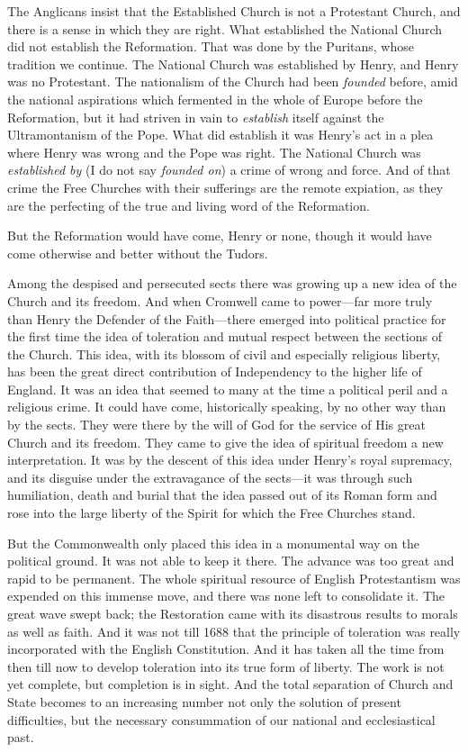 \documentclass[12pt,a5paper,twoside]{book}
\begin{document}
The Anglicans insist that the Established Church is 
not a Protestant Church, and there is a sense in 
which they are right. What established the National 
Church did not establish the Reformation. That was 
done by the Puritans, whose tradition we continue. 
The National Church was established by Henry, and 
Henry was no Protestant. The nationalism of the 
Church had been \textit{founded} before, amid the national 
aspirations which fermented in the whole of Europe 
before the Reformation, but it had striven in vain to 
\textit{establish} itself against the Ultramontanism of the Pope. 
What did establish it was Henry's act in a plea where 
Henry was wrong and the Pope was right. The 
National Church was \textit{established by} (I do not say 
\textit{founded on}) a crime of wrong and force. And of that 
crime the Free Churches with their sufferings are the 
remote expiation, as they are the perfecting of the 
true and living word of the Reformation. 

But the Reformation would have come, Henry or 
none, though it would have come otherwise and better 
without the Tudors. 

Among the despised and persecuted sects there was 
growing up a new idea of the Church and its freedom. 
And when Cromwell came to power---far more truly 
than Henry the Defender of the Faith---there emerged 
into political practice for the first time the idea of 
toleration and mutual respect between the sections of 
the Church. This idea, with its blossom of civil and 
especially religious liberty, has been the great direct 
contribution of Independency to the higher life of 
England. It was an idea that seemed to many at the 
time a political peril and a religious crime. It could 
have come, historically speaking, by no other way than 
by the sects. They were there by the will of God 
for the service of His great Church and its freedom. 
They came to give the idea of spiritual freedom a 
new interpretation. It was by the descent of this idea 
under Henry's royal supremacy, and its disguise under 
the extravagance of the sects---it was through such 
humiliation, death and burial that the idea passed out 
of its Roman form and rose into the large liberty of 
the Spirit for which the Free Churches stand. 

But the Commonwealth only placed this idea in a 
monumental way on the political ground. It was not 
able to keep it there. The advance was too great and 
rapid to be permanent. The whole spiritual resource 
of English Protestantism was expended on this immense 
move, and there was none left to consolidate it. 
The great wave swept back; the Restoration came 
with its disastrous results to morals as well as faith. 
And it was not till 1688 that the principle of toleration 
was really incorporated with the English Constitution. 
And it has taken all the time from then till 
now to develop toleration into its true form of liberty. 
The work is not yet complete, but completion is in 
sight. And the total separation of Church and State 
becomes to an increasing number not only the solution 
of present difficulties, but the necessary consummation 
of our national and ecclesiastical past. 
\end{document}
